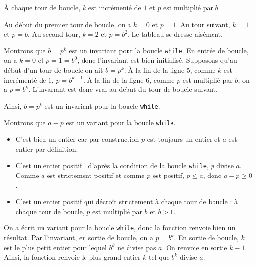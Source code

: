 \question{} À chaque tour de boucle, $k$ est incrémenté de $1$ et $p$ est multiplié par $b$.

Au début du premier tour de boucle, on a $k=0$ et $p=1$. Au tour suivant, $k=1$ et $p = b$. Au second tour, $k=2$ et $p=b^2$. Le tableau se dresse aisément.

\question{} Montrons que \og $b = p^k$ \fg{} est un invariant pour la boucle \texttt{while}. En entrée de boucle, on a $k=0$ et $p=1=b^0$, donc l'invariant est bien initialisé.
Supposons qu'au début d'un tour de boucle on ait $b = p^k$. À la fin de la ligne 5, comme $k$ est incrémenté de $1$, $p = b^{k-1}$. À la fin de la ligne 6, comme $p$ est multiplié par $b$, on a $p = b^k$.
L'invariant est donc vrai au début du tour de boucle suivant.

Ainsi, \og $b = p^k$ \fg{} est un invariant pour la boucle \texttt{while}.

\question{} Montrons que \og $a - p$ \fg{} est un variant pour la boucle \texttt{while}. 
\begin{itemize}
    \item C'est bien un entier car par construction $p$ est toujours un entier et $a$ est entier par définition. 
    \item C'est un entier positif : d'après la condition de la boucle \texttt{while}, $p$ divise $a$. Comme $a$ est strictement positif et comme $p$ est positif, $p \leq a$, donc $a-p\geq 0$. 
    \item C'est un entier positif qui décroît strictement à chaque tour de boucle : à chaque tour de boucle, $p$ est multiplié par $b$ et $b>1$. 
\end{itemize}

\question{} On a écrit un variant pour la boucle \texttt{while}, donc la fonction renvoie bien un résultat. Par l'invariant, en sortie de boucle, on a $p = b^k$. 
En sortie de boucle, $k$ est le plus petit entier pour lequel $b^k$ ne divise pas $a$. On renvoie en sortie $k-1$. Ainsi, la fonction renvoie le plus grand entier $k$ tel que $b^k$ divise $a$. 


